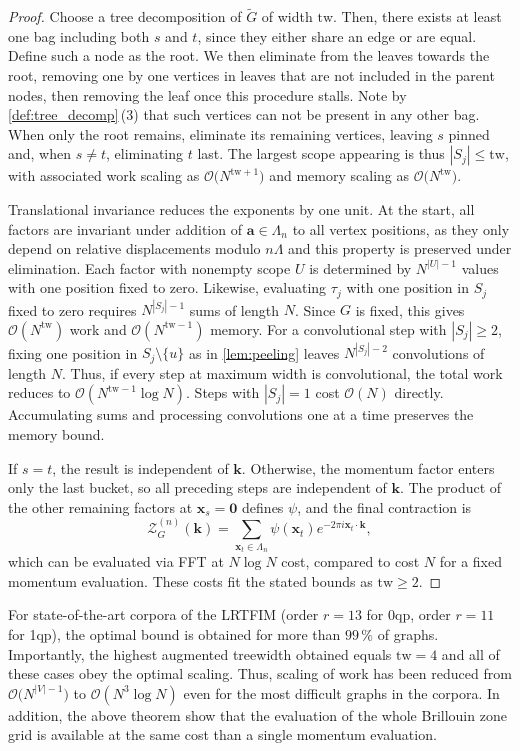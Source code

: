 \documentclass[]{amsart}
\numberwithin{mythm}{section}
\begin{document}
\begin{proof}
    Choose a tree decomposition of $\tilde G$ of width $\mathrm{tw}$. Then, there exists at least one bag including both $s$ and $t$, since they either share an edge or are equal. Define such a node as the root. We then eliminate from the leaves towards the root, removing one by one vertices in leaves that are not included in the parent nodes, then removing the leaf once this procedure stalls. Note by \cref{def:tree_decomp}\,(3) that such vertices can not be present in any other bag. When only the root remains, eliminate its remaining vertices, leaving $s$ pinned and, when $s\ne t$, eliminating $t$ last. The largest scope appearing is thus $|S_j|\le \mathrm{tw}$, with associated work scaling as $\mathcal O\big(N^{\mathrm{tw}+1}\big)$ and memory scaling as $\mathcal O\big(N^{\mathrm{tw}}\big)$.

    Translational invariance reduces the exponents by one unit. At the start, all factors are invariant under addition of $\bm a \in \Lambda_n$ to all vertex positions, as they only depend on relative displacements modulo $n\Lambda$ and this property is preserved under elimination. Each factor with nonempty scope $U$ is determined by $N^{|U|-1}$ values with one position fixed to zero. Likewise, evaluating $\tau_j$ with one position in $S_j$ fixed to zero requires $N^{|S_j|-1}$ sums of length $N$. Since $G$ is fixed, this gives $\mathcal O(N^{\mathrm{tw}})$ work and $\mathcal O(N^{\mathrm{tw}-1})$ memory. For a convolutional step with $|S_j|\ge2$, fixing one position in $S_j\setminus\{u\}$ as in \cref{lem:peeling} leaves $N^{|S_j|-2}$ convolutions of length $N$. Thus, if every step at maximum width is convolutional, the total work reduces to $\mathcal O(N^{\mathrm{tw}-1}\log N)$. Steps with $|S_j|=1$ cost $\mathcal O(N)$ directly. Accumulating sums and processing convolutions one at a time preserves the memory bound.

    If $s=t$, the result is independent of $\bm k$. Otherwise, the momentum factor enters only the last bucket, so all preceding steps are independent of $\bm k$. The product of the other remaining factors at $\bm x_s=\bm 0$ defines $\psi$, and the final contraction is
    \[
    \mathcal Z_{G}^{(n)}(\bm k)=\sum_{\bm x_t \in \Lambda_n} \psi(\bm x_t) e^{-2\pi i \bm x_t\cdot \bm k},
    \]
    which can be evaluated via FFT at $N\log N$ cost, compared to cost $N$ for a fixed momentum evaluation. These costs fit the stated bounds as $\mathrm{tw}\ge2$.
\end{proof}
For state-of-the-art corpora of the LRTFIM (order $r=13$ for 0qp, order $r=11$ for 1qp), the optimal bound is obtained for more than $99\,\%$ of graphs. Importantly, the highest augmented treewidth obtained equals $\mathrm{tw}=4$ and all of these cases obey the optimal scaling. Thus, scaling of work has been reduced from $\mathcal O\big(N^{|V|-1}\big)$ to  $\mathcal O(N^3\log N)$ even for the most difficult graphs in the corpora. In addition, the above theorem show that the evaluation of the whole Brillouin zone grid is available at the same cost than a single momentum evaluation.
\end{document}
